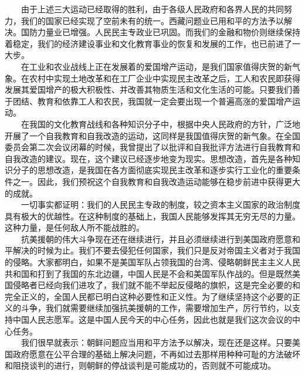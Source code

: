 \documentclass[cn,11pt,chinese]{elegantbook}
\begin{document}
　　由于上述三大运动已经取得的胜利，由于各级人民政府和各界人民的共同努力，我们的国家已经实现了空前未有的统一。西藏问题业已用和平的方法予以解决。国防力量业已增强。人民民主专政业已巩固。而我们的金融和物价则继续保持着稳定，我们的经济建设事业和文化教育事业的恢复和发展的工作，也已前进了一大步。\\
　　在工业和农业战线上正在发展着的爱国增产运动，是我们国家值得庆贺的新气象。在农村中实现土地改革和在工厂企业中实现民主改革之后，工人和农民即获得发展其爱国增产的极大积极性、并改善其物质生活和文化生活的可能。只要我们善于团结、教育和依靠工人和农民，我国就一定会要出现一个普遍高涨的爱国增产运动。\\
　　在我国的文化教育战线和各种知识分子中，根据中央人民政府的方针，广泛地开展了一个自我教育和自我改造的运动，这同样是我国值得庆贺的新气象。在全国委员会第二次会议闭幕的时候，我曾提出了以批评和自我批评方法进行自我教育和自我改造的建议。现在，这个建议已经逐步地变为现实。思想改造，首先是各种知识分子的思想改造，是我国在各方面彻底实现民主改革和逐步实行工业化的重要条件之一。因此，我们预祝这个自我教育和自我改造运动能够在稳步前进中获得更大的成就。\\
　　一切事实都证明：我们的人民民主专政的制度，较之资本主义国家的政治制度具有极大的优越性。在这种制度的基础上，我国人民能够发挥其无穷无尽的力量。这种力量，是任何敌人所不能战胜的。\\
　　抗美援朝的伟大斗争现在还在继续进行，并且必须继续进行到美国政府愿意和平解决的时候为止。我们不要去侵犯任何国家，我们只是反对帝国主义者对于我国的侵略。大家都明白，如果不是美国军队占领我国的台湾、侵略朝鲜民主主义人民共和国和打到了我国的东北边疆，中国人民是不会和美国军队作战的。但是既然美国侵略者已经向我们进攻了，我们就不能不举起反侵略的旗帜，这是完全必要的和完全正义的，全国人民都已明白这种必要性和正义性。为了继续坚持这个必要的正义的斗争，我们就需要继续加强抗美援朝的工作，需要增加生产，厉行节约，以支持中国人民志愿军。这是中国人民今天的中心任务，因此也就是我们这次会议的中心任务。\\
　　我们很早就表示：朝鲜问题应当用和平方法予以解决，现在还是这样。只要美国政府愿意在公平合理的基础上解决问题，不再如过去那样用种种可耻的方法破坏和阻挠谈判的进行，则朝鲜的停战谈判是可能成功的，否则就不可能成功。\\
\end{document}
